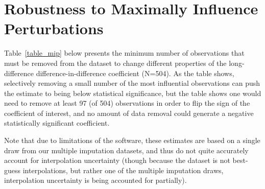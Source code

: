 \documentclass[12pt]{article}
\begin{document}
\section{Robustness to Maximally Influence Perturbations}\label{appendix_broderick}
\setcounter{table}{0}
\setcounter{figure}{0}
\renewcommand{\thetable}{N\arabic{table}}
\renewcommand{\thefigure}{N\arabic{figure}}
\normalsize

Table~\ref{table_mip} below presents the minimum number of observations that must be removed from the dataset to change different properties of the long-difference difference-in-difference coefficient (N=504). As the table shows, selectively removing a small number of the most influential observations can push the estimate to being below statistical significance, but the table shows one would need to remove at least 97 (of 504) observations in order to flip the sign of the coefficient of interest, and no amount of data removal could generate a negative statistically significant coefficient.

Note that due to limitations of the \cite{broderick2021} software, these estimates are based on a single draw from our multiple imputation datasets, and thus do not quite accurately account for interpolation uncertainty (though because the dataset is not best-guess interpolations, but rather one of the multiple imputation draws, interpolation uncertainty is being accounted for partially).





\pagebreak \clearpage



\singlespacing
{}




\end{document}
